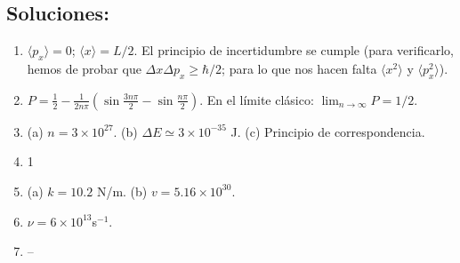 \documentclass{tufte-handout}
\begin{document}
\subsection{\textbf{Soluciones:}}
\begin{enumerate}
    \item $\langle p_x\rangle =0$;  $\langle x\rangle =L/2$. El principio de incertidumbre
    se cumple (para verificarlo, hemos de probar que $\Delta x \Delta p_x\geq \hbar/2$; para lo que nos hacen falta $\langle x^2\rangle$ y $\langle p_x^2\rangle$).
    \item $P=\frac{1}{2}-\frac{1}{2n\pi}(\sin \frac{3n\pi}{2} - \sin\frac{n\pi}{2})$. En el límite clásico: $\lim_{n\rightarrow \infty}P=1/2$.
   \item (a) $n=3\times 10^{27}$. (b) $\Delta E\simeq 3\times 10^{-35}$ J. (c) Principio de
   correspondencia.
   \item 1
   \item (a) $k=10.2$ N/m. (b) $v=5.16\times 10^{30}$.
  \item $\nu=6\times 10^{13}$s$^{-1}$.   
  \item --
\end{enumerate}
\end{document}
